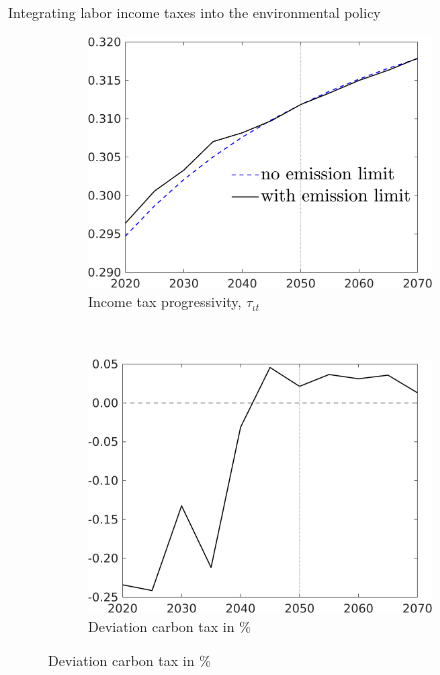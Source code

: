 \documentclass[11pt,aspectratio=169]{beamer}
\begin{document}
\begin{frame}{Integrating labor income taxes into the environmental policy}
	\vspace{-3mm}
	\centering
	\begin{figure}[h!!]
		\centering
		
		\begin{subfigure}{0.45\textwidth}		
			\caption{{Income tax progressivity, $\tau_{\iota t}$}}
			\includegraphics[width=1\textwidth]{../codding_model/own_basedOnFried/optimalPol_010922_revision/figures/all_13Sept22/NewCalib_pol_TvsNoT_taul_base_emnet1_Sun2_spillover0_knspil3_xgr0_nsk0_sep0_extern0_PV1_etaa0.79_lgd1.png}
		\end{subfigure}
		\begin{minipage}[]{0.05\textwidth}
			\
		\end{minipage}
		\begin{subfigure}{0.45\textwidth}		
			\caption{{Deviation carbon tax in \%}}
			\includegraphics[width=1\textwidth]{../codding_model/own_basedOnFried/optimalPol_010922_revision/figures/all_13Sept22/NewCalib_polTaulFixedPer_T_Tauf_Sun2_emnet1_spillover0_knspil3_xgr0_nsk0_sep0_extern0_PV1_etaa0.79.png}

\end{subfigure}
\end{figure}
\end{frame}
\end{document}
